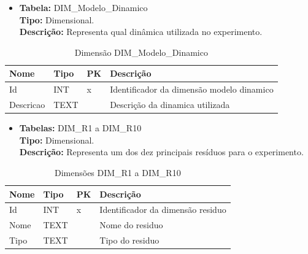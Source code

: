 
\begin{itemize}
	\item
		\textbf{Tabela:} DIM\_Modelo\_Dinamico \\
		\textbf{Tipo:} Dimensional. \\
		\textbf{Descrição:} Representa qual dinâmica utilizada no experimento. \\
\end{itemize}
\begin{table}[!htbp]
	\caption{Dimensão DIM\_Modelo\_Dinamico}
	\centering
	\begin{tabular}{@{}llll@{}}
	\toprule
	\textbf{Nome} 	& \textbf{Tipo} & \textbf{PK} & \textbf{Descrição}           			\\ \midrule
	Id            	& INT           & x           & Identificador da dimensão modelo dinamico   \\
	Descricao     	& TEXT       &             & Descrição da dinamica utilizada        \\ \bottomrule
	\end{tabular}
\end{table}


\begin{itemize}
	\item
		\textbf{Tabelas:} DIM\_R1 a DIM\_R10 \\
		\textbf{Tipo:} Dimensional. \\
		\textbf{Descrição:} Representa um dos dez principais resíduos para o experimento. \\
\end{itemize}
\begin{table}[!htbp]
	\caption{Dimensões DIM\_R1 a DIM\_R10}
	\centering
	\begin{tabular}{@{}llll@{}}
	\toprule
	\textbf{Nome} 	& \textbf{Tipo} & \textbf{PK} & \textbf{Descrição}           		\\ \midrule
	Id            	& INT           & x           & Identificador da dimensão residuo   \\
	Nome 		  & TEXT       &             & Nome do residuo 					   	\\ 
	Tipo          & TEXT       &             & Tipo do residuo           	   		\\ \bottomrule   
	\end{tabular}
\end{table}
	
